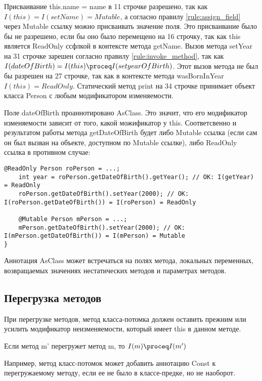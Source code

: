 Присваивание this.name = name в 11 строчке разрешено, так как $I(this) = I(setName) = Mutable$, а согласно правилу \ref{rule:assign_field} через Mutable ссылку можно присваивать значение поля. Это присваивание было бы не разрешено, если бы оно было перемещено  на 16 строчку, так как this является ReadOnly ссфлкой в контексте метода getName. Вызов метода setYear на 31 строчке зарешен согласно правилу \ref{rule:invoke_method}, так как $I(dateOfBirth) = I(this) \proceq I(setyearOfBirth)$. Этот вызов метода не был бы разрешен на 27 строчке, так как в контексте метода wasBornInYear $I(this) = ReadOnly$. Статический метод print на 34 строчке принимает объект класса Person с любым модификатором изменяемости. 

Поле dateOfBirth проаннотировано AsClass. Это значит, что его модификатор изменяемости зависит от того, какой можификатор у this. Соответсвенно и результатом работы метода getDateOfBirth будет либо Mutable ссылка (если сам он был вызван на объекте, доступном по Mutable ссылке), либо ReadOnly ссылка в противном случае:

\begin{lstlisting}[caption=Использование аннотации AsClass, label=code:as_class]
	@ReadOnly Person roPerson = ...;
	int year = roPerson.getDateOfBirth().getYear(); // OK: I(getYear) = ReadOnly
	roPerson.getDateOfBirth().setYear(2000); // OK: I(roPerson.getDateOfBirth()) = I(roPerson) = ReadOnly
	
	@Mutable Person mPerson = ...;
	mPerson.getDateOfBirth().setYear(2000); // OK: I(mPerson.getDateOfBirth()) = I(mPerson) = Mutable
}
\end{lstlisting} 

Аннотация AsClass может встречаться на полях метода, локальных переменных, возвращаемых значениях нестатических методов и параметрах методов.

\subsection{Перегрузка методов}

При перегрузке методов, метод класса-потомка должен оставить прежним или усилить модификатор неизменяемости, который имеет this в данном методе. 

\begin{Rule}\label{rule:override_method}
Если метод m' перегружет метод m, то $I(m) \proceq I(m')$
\end{Rule}

Например, метод класс-потомок может добавить аннотацию Const к перегружаемому методу, если ее не было в классе-предке, но не наоборот. 

